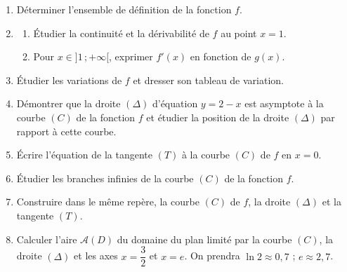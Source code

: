 \documentclass[11pt]{article}
\begin{document}
\begin{enumerate}
  \item Déterminer l'ensemble de définition de la fonction $f$.
  \item \begin{enumerate}[label=\alph*.]
    \item Étudier la continuité et la dérivabilité de $f$ au point $x = 1$.
    \item Pour $x \in ]1\,;+\infty[$, exprimer $f'(x)$ en fonction de $g(x)$.
  \end{enumerate}
  \item Étudier les variations de $f$ et dresser son tableau de variation.
  \item Démontrer que la droite $(\Delta)$ d'équation $y = 2 - x$ est asymptote à la courbe $(C)$ de la fonction $f$ et étudier la position de la droite $(\Delta)$ par rapport à cette courbe.
  \item Écrire l'équation de la tangente $(T)$ à la courbe $(C)$ de $f$ en $x = 0$.
  \item Étudier les branches infinies de la courbe $(C)$ de la fonction $f$.
  \item Construire dans le même repère, la courbe $(C)$ de $f$, la droite $(\Delta)$ et la tangente $(T)$.
  \item Calculer l'aire $\mathcal{A}(D)$ du domaine du plan limité par la courbe $(C)$, la droite $(\Delta)$ et les axes $x = \dfrac{3}{2}$ et $x = e$. On prendra $\ln 2 \approx 0{,}7$ ; $e \approx 2{,}7$.
\end{enumerate}
\end{document}
